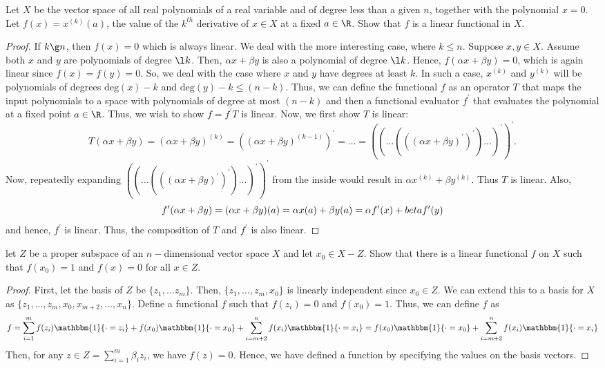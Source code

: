 \begin{question}
    Let $X$ be the vector space of all real polynomials of a real variable and of degree less than a given $n$, together with the polynomial $x = 0$. Let $f(x) = x^{(k)}(a)$, the value of the $k^{th}$ derivative of $x \in X$ at a fixed $a \in \R$. Show that $f$ is a linear functional in $X$.
    \label{section2.9-9}
\end{question}
\begin{proof}
    If $k \g n$, then $f(x) = 0$ which is always linear. We deal with the more interesting case, where $k \leq n$. Suppose $x , y \in X$. Assume both $x$ and $y$ are polynomials of degree $\l k$. Then, $\alpha x + \beta y$ is also a polynomial of degree $\l k$. Hence, $f(\alpha x + \beta y) = 0$, which is again linear since $f(x) = f(y) = 0$. So, we deal with the case where $x$ and $y$ have degrees at least $k$. In such a case, $x^{(k)}$ and $y^{(k)}$ will be polynomials of degrees $\textrm{deg}(x) - k$ and $\textrm{deg}(y) - k \leq (n-k)$. Thus, we can define the functional $f$ as an operator $T$ that maps the input polynomials to a space with polynomials of degree at most $(n-k)$ and then a functional evaluator $f^\prime$ that evaluates the polynomial at a fixed point $a \in \R$. Thus, we wish to show $f = f^\prime T$ is linear. Now, we first show $T$ is linear:
    \[T(\alpha x + \beta y) = (\alpha x + \beta y)^{(k)} = ((\alpha x + \beta y)^{(k-1)})^\prime = \ldots = ((\ldots(((\alpha x + \beta y)^\prime)^\prime)\ldots)^\prime)^\prime. \]
    Now, repeatedly expanding $((\ldots(((\alpha x + \beta y)^\prime)^\prime)\ldots)^\prime)^\prime$ from the inside would result in $\alpha x^{(k)} + \beta y^{(k)}$. Thus $T$ is linear. Also, 
    \[f^\prime(\alpha x + \beta y) = (\alpha x + \beta y)(a) = \alpha x(a) + \beta y(a) = \alpha f^\prime(x) + \\beta f^\prime(y)\]
    and hence, $f^\prime $ is linear. Thus, the composition of $T$ and $f^\prime$ is also linear.
\end{proof}

\begin{question}
    let $Z$ be a proper subspace of an $n-$dimensional vector space $X$ and let $x_0 \in X - Z$. Show that there is a linear functional $f$ on $X$ such that $f(x_0) = 1$ and $f(x) = 0$ for all $x \in Z$.
    \label{section2.9-10}
\end{question}
\begin{proof}
    First, let the basis of $Z$ be $\{z_1 , \ldots z_m\}$. Then, $\{z_1 , \ldots ,z_m , x_0\}$ is linearly independent since $x_0 \in Z$. We can extend this to a basis for $X$ as $\{z_1 , \ldots , z_m , x_0 , x_{m+2},  \ldots , x_n\}$. Define a functional $f$ such that $f(z_i) = 0$ and $f(x_0) = 1$. Thus, we can define $f$ as
    \[f = \sum_{i=1}^m f(z_i) \mathbbm{1}\{\cdot=z_i\} + f(x_0) \mathbbm{1}\{\cdot = x_0\} + \sum_{i=m+2}^n f(x_i) \mathbbm{1}\{\cdot=x_i\} =  f(x_0) \mathbbm{1}\{\cdot = x_0\} + \sum_{i=m+2}^n f(x_i) \mathbbm{1}\{\cdot=x_i\}\]
    Then, for any $z \in Z = \sum_{i=1}^m \beta_i z_i$, we have $f(z) = 0$. 
    Hence, we have defined a function by specifying the values on the basis vectors.
\end{proof}

